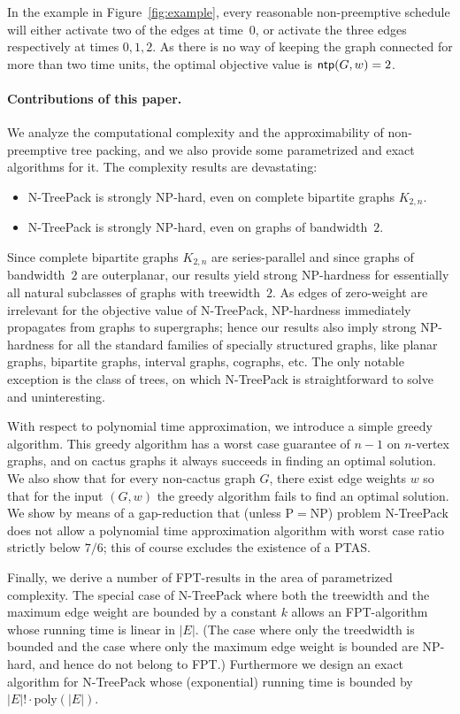 \documentclass[runningheads]{llncs}
\DeclareMathOperator{\ntp}{\text{\sf ntp}}
\newcommand{\xxxNTP}{{\sc N-TreePack}}
\begin{document}
In the example in Figure~\ref{fig:example}, every reasonable non-preemptive
schedule will either activate two of the edges at time~$0$, or activate the three
edges respectively at times $0,1,2$.
As there is no way of keeping the graph connected for more than two time units, 
the optimal objective value is $\ntp(G,w)=2$.

\paragraph{Contributions of this paper.}
We analyze the computational complexity and the approximability of non-preemptive 
tree packing, and we also provide some parametrized and exact algorithms for it.
The complexity results are devastating:
\begin{itemize}
\item {\xxxNTP} is strongly NP-hard, even on complete bipartite graphs $K_{2,n}$.
\item {\xxxNTP} is strongly NP-hard, even on graphs of bandwidth~$2$.
\end{itemize}
Since complete bipartite graphs $K_{2,n}$ are series-parallel and since graphs of 
bandwidth~$2$ are outerplanar, our results yield strong NP-hardness for essentially 
all natural subclasses of graphs with treewidth~$2$.
As edges of zero-weight are irrelevant for the objective value of {\xxxNTP}, NP-hardness 
immediately propagates from graphs to supergraphs; hence our results also imply 
strong NP-hardness for all the standard families of specially structured graphs, 
like planar graphs, bipartite graphs, interval graphs, cographs, etc.
The only notable exception is the class of trees, on which {\xxxNTP} is 
straightforward to solve and uninteresting.

With respect to polynomial time approximation, we introduce a simple greedy algorithm.
This greedy algorithm has a worst case guarantee of $n-1$ on $n$-vertex graphs,
and on cactus graphs it always succeeds in finding an optimal solution.
We also show that for every non-cactus graph $G$, there exist edge weights $w$ so
that for the input $(G,w)$ the greedy algorithm fails to find an optimal solution.
We show by means of a gap-reduction that (unless P$=$NP) problem {\xxxNTP} does not
allow a polynomial time approximation algorithm with worst case ratio strictly below $7/6$;
this of course excludes the existence of a PTAS.

Finally, we derive a number of FPT-results in the area of parametrized complexity.
The special case of {\xxxNTP} where both the treewidth and the maximum edge weight are 
bounded by a constant $k$ allows an FPT-algorithm whose running time is linear in $|E|$.
(The case where only the treedwidth is bounded and the case where only the maximum 
edge weight is bounded are NP-hard, and hence do not belong to FPT.)
Furthermore we design an exact algorithm for {\xxxNTP} whose (exponential) 
running time is bounded by $|E|!\cdot\text{poly}(|E|)$.
\end{document}
